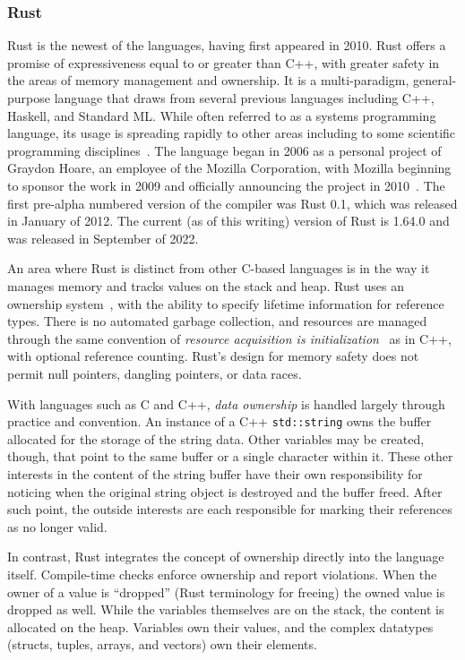 \subsubsection{Rust}

Rust is the newest of the languages, having first appeared in 2010. Rust offers a promise of expressiveness equal to or greater than C++, with greater safety in the areas of memory management and ownership. It is a multi-paradigm, general-purpose language that draws from several previous languages including C++, Haskell, and Standard ML. While often referred to as a systems programming language, its usage is spreading rapidly to other areas including to some scientific programming disciplines~\cite{nature.rust.2020}. The language began in 2006 as a personal project of Graydon Hoare, an employee of the Mozilla Corporation, with Mozilla beginning to sponsor the work in 2009 and officially announcing the project in 2010~\cite{asay.2021}. The first pre-alpha numbered version of the compiler was Rust 0.1, which was released in January of 2012. The current (as of this writing) version of Rust is 1.64.0 and was released in September of 2022.

An area where Rust is distinct from other C-based languages is in the way it manages memory and tracks values on the stack and heap. Rust uses an ownership system~\cite[Chapter~4]{programming.rust.2021}, with the ability to specify lifetime information for reference types. There is no automated garbage collection, and resources are managed through the same convention of \textit{resource acquisition is initialization}~\cite{cpp.design.evolution.1994} as in C++, with optional reference counting. Rust's design for memory safety does not permit null pointers, dangling pointers, or data races.

With languages such as C and C++, \textit{data ownership} is handled largely through practice and convention. An instance of a C++ \texttt{std::string} owns the buffer allocated for the storage of the string data. Other variables may be created, though, that point to the same buffer or a single character within it. These other interests in the content of the string buffer have their own responsibility for noticing when the original string object is destroyed and the buffer freed. After such point, the outside interests are each responsible for marking their references as no longer valid.

In contrast, Rust integrates the concept of ownership directly into the language itself. Compile-time checks enforce ownership and report violations. When the owner of a value is ``dropped'' (Rust terminology for freeing) the owned value is dropped as well. While the variables themselves are on the stack, the content is allocated on the heap. Variables own their values, and the complex datatypes (structs, tuples, arrays, and vectors) own their elements.

